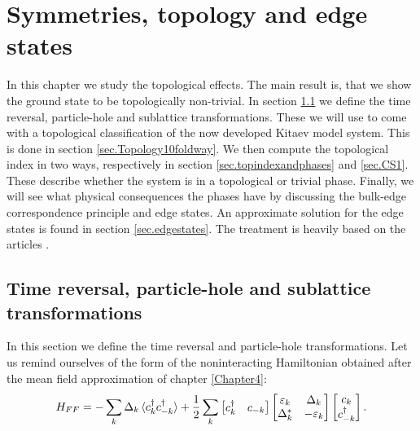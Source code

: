 
\chapter{Symmetries, topology and edge states } %

\label{Chapter7} %


In this chapter we study the topological effects. The main result is, that we show the ground state to be topologically non-trivial. In section \ref{sec.SymmetriesTRandPH} we define the time reversal, particle-hole and sublattice transformations. These we will use to come with a topological classification of the now developed Kitaev model system. This is done in section \ref{sec.Topology10foldway}. We then compute the topological index in two ways, respectively in section \ref{sec.topindexandphases} and \ref{sec.CS1}. These describe whether the system is in a topological or trivial phase. Finally, we will see what physical consequences the phases have by discussing the bulk-edge correspondence principle and edge states. An approximate solution for the edge states is found in section \ref{sec.edgestates}. The treatment is heavily based on the articles \cite{Ludwig.Topology, Chiu.Topology, Alicea}. 

\section{Time reversal, particle-hole and sublattice transformations}
\label{sec.SymmetriesTRandPH}
In this section we define the time reversal and particle-hole transformations. Let us remind ourselves of the form of the noninteracting Hamiltonian obtained after the mean field approximation of chapter \ref{Chapter4}: 
\begin{equation}
H_{FF} = -\sum_k \Delta_k \braket {c^\dagger_k c^\dagger_{-k}} + \frac{1}{2}\sum_{k} \begin{bmatrix} c^\dagger_k & c_{-k} \end{bmatrix} \begin{bmatrix} \varepsilon_k & \Delta_k \\ \Delta^*_k & -\varepsilon_k \end{bmatrix} \begin{bmatrix} c_k \\ c^\dagger_{-k} \end{bmatrix}. \nonumber 
\end{equation}

